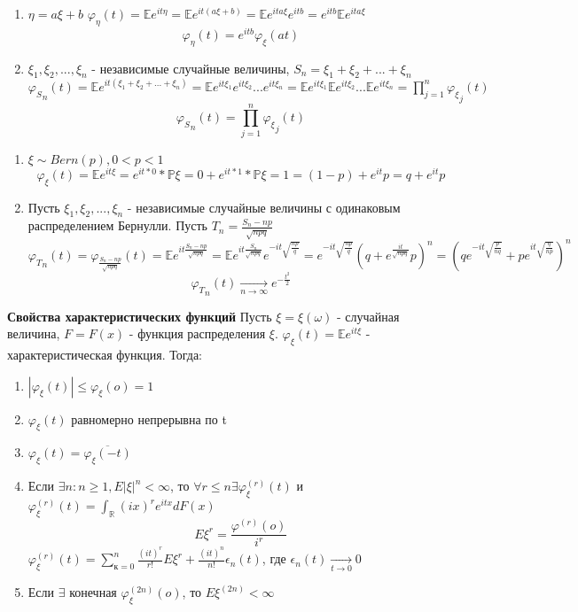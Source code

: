 \documentclass{article}
\begin{document}
\begin{enumerate}
\item $\eta = a\xi + b$ \newline
$\varphi_{\eta}(t) = \mathbb {E} e^{it\eta} = \mathbb {E} e^{it(a\xi + b)} =  \mathbb {E} e^{ita\xi} e^{itb} = e^{itb}\mathbb {E}e^{ita\xi}$
$$\varphi_{\eta}(t) = e^{itb}\varphi_{\xi}(at)$$
\item $\xi_1, \xi_2, ..., \xi_n$ - независимые случайные величины, 
$S_n = \xi_1+ \xi_2+ ... + \xi_n$ \newline
${\varphi_S}_n(t) = \mathbb{E}e^{it(\xi_1+ \xi_2+ ... + \xi_n)} = \mathbb{E}e^{it\xi_1}e^{it\xi_2}...e^{it\xi_n} =  \mathbb{E}e^{it\xi_1}\mathbb{E}e^{it\xi_2}...\mathbb{E}e^{it\xi_n} = \prod\limits_{j =1}^n{\varphi_{\xi}}_j(t)$
$${\varphi_S}_n(t) = \prod\limits_{j =1}^n{\varphi_{\xi}}_j(t)$$
\end{enumerate}
\Ex
\begin{enumerate}
\item $\xi \sim Bern(p), 0<p<1$
$$\varphi_{\xi}(t) = \mathbb{E}e^{it\xi} = e^{it*0}*\mathbb {P}{\xi = 0} + e^{it*1}*\mathbb {P}{\xi=1} = (1-p)+ e^{it}p = q + e^{it}p$$
\item Пусть $\xi_1, \xi_2, ..., \xi_n$ - независимые случайные величины с одинаковым распределением Бернулли. Пусть $T_n = \frac{S_n - np}{ \sqrt{npq}}$
$${\varphi_T}_n(t) = \varphi_{\frac{S_n - np}{\sqrt{npq}}}(t) = \mathbb {E}e^{it\frac{S_n - np}{ \sqrt{npq}}} =\mathbb {E}e^{it \frac{S_n}{\sqrt{npq}}}e^{-it\sqrt{\frac{np}{q}}} = e^{-it\sqrt{\frac{np}{q}}} (q+e^{\frac{it}{\sqrt{npq}}}p)^n = (qe^{-it\sqrt{\frac{p}{nq}}} + pe^{it\sqrt{\frac{q}{np}}})^n$$
$${\varphi_T}_n(t)\underset{n \to \infty}{\longrightarrow} e^{-\frac{t^2}{2}}$$
\end{enumerate}

\textbf{Свойства характеристических функций}
\Th
Пусть $\xi = \xi(\omega)$ - случайная величина, $F = F(x)$ - функция распределения $\xi$.
$\varphi_{\xi}(t) = \mathbb{E}e^{it\xi}$  - характеристическая функция. Тогда:
\begin{enumerate}
\item $|\varphi_{\xi}(t)| \leqslant \varphi_{\xi}(o) = 1$
\item $\varphi_{\xi}(t)$ равномерно непрерывна по t
\item $\varphi_{\xi}(t) = \overline{\varphi_{\xi}(-t)} $
\item Если $\exists n: n \geqslant 1, E|\xi|^n < \infty$, то $\forall r \leqslant n \exists \varphi^{(r)}_{\xi}(t)$ и $\varphi^{(r)}_{\xi}(t) = \int_{\mathbb {R}} (ix)^re^{itx}d{F(x)}$
$$ E\xi^r = \frac{\varphi^{(r)}(o)}{i^r}$$
$\varphi^{(r)}_{\xi}(t) = \sum\limits_{к=0}^n \frac{(it)^r}{r!}E\xi^r + \frac{(it)^n}{n!}\epsilon_n(t)$, где $\epsilon_n(t) \underset{t \to 0}{\longrightarrow} 0$
\item Если $\exists$ конечная $\varphi_{\xi}^{(2n)}(o)$, то $E\xi^{(2n)}< \infty$  
\end{enumerate}
\end{document}
